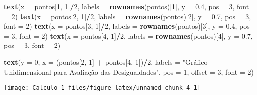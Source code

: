 \documentclass[]{book}
\newenvironment{Shaded}{\begin{snugshade}}{\end{snugshade}}
\newcommand{\KeywordTok}[1]{\textcolor[rgb]{0.13,0.29,0.53}{\textbf{#1}}}
\newcommand{\DataTypeTok}[1]{\textcolor[rgb]{0.13,0.29,0.53}{#1}}
\newcommand{\DecValTok}[1]{\textcolor[rgb]{0.00,0.00,0.81}{#1}}
\newcommand{\FloatTok}[1]{\textcolor[rgb]{0.00,0.00,0.81}{#1}}
\newcommand{\StringTok}[1]{\textcolor[rgb]{0.31,0.60,0.02}{#1}}
\newcommand{\OperatorTok}[1]{\textcolor[rgb]{0.81,0.36,0.00}{\textbf{#1}}}
\newcommand{\NormalTok}[1]{#1}
\begin{document}
\begin{Shaded}
\begin{Highlighting}[]
\KeywordTok{text}\NormalTok{(}\DataTypeTok{x =}\NormalTok{ pontos[}\DecValTok{1}\NormalTok{, }\DecValTok{1}\NormalTok{]}\OperatorTok{/}\DecValTok{2}\NormalTok{, }\DataTypeTok{labels =} \KeywordTok{rownames}\NormalTok{(pontos)[}\DecValTok{1}\NormalTok{], }\DataTypeTok{y =} \FloatTok{0.4}\NormalTok{,}
     \DataTypeTok{pos =} \DecValTok{3}\NormalTok{, }\DataTypeTok{font =} \DecValTok{2}\NormalTok{)}
\KeywordTok{text}\NormalTok{(}\DataTypeTok{x =}\NormalTok{ pontos[}\DecValTok{2}\NormalTok{, }\DecValTok{1}\NormalTok{]}\OperatorTok{/}\DecValTok{2}\NormalTok{, }\DataTypeTok{labels =} \KeywordTok{rownames}\NormalTok{(pontos)[}\DecValTok{2}\NormalTok{], }\DataTypeTok{y =} \FloatTok{0.7}\NormalTok{,}
     \DataTypeTok{pos =} \DecValTok{3}\NormalTok{, }\DataTypeTok{font =} \DecValTok{2}\NormalTok{)}
\KeywordTok{text}\NormalTok{(}\DataTypeTok{x =}\NormalTok{ pontos[}\DecValTok{3}\NormalTok{, }\DecValTok{1}\NormalTok{]}\OperatorTok{/}\DecValTok{2}\NormalTok{, }\DataTypeTok{labels =} \KeywordTok{rownames}\NormalTok{(pontos)[}\DecValTok{3}\NormalTok{], }\DataTypeTok{y =} \FloatTok{0.4}\NormalTok{,}
     \DataTypeTok{pos =} \DecValTok{3}\NormalTok{, }\DataTypeTok{font =} \DecValTok{2}\NormalTok{)}
\KeywordTok{text}\NormalTok{(}\DataTypeTok{x =}\NormalTok{ pontos[}\DecValTok{4}\NormalTok{, }\DecValTok{1}\NormalTok{]}\OperatorTok{/}\DecValTok{2}\NormalTok{, }\DataTypeTok{labels =} \KeywordTok{rownames}\NormalTok{(pontos)[}\DecValTok{4}\NormalTok{], }\DataTypeTok{y =} \FloatTok{0.7}\NormalTok{,}
     \DataTypeTok{pos =} \DecValTok{3}\NormalTok{, }\DataTypeTok{font =} \DecValTok{2}\NormalTok{)}

\KeywordTok{text}\NormalTok{(}\DataTypeTok{y =} \DecValTok{0}\NormalTok{, }\DataTypeTok{x =}\NormalTok{ (pontos[}\DecValTok{2}\NormalTok{, }\DecValTok{1}\NormalTok{] }\OperatorTok{+}\StringTok{ }\NormalTok{pontos[}\DecValTok{4}\NormalTok{, }\DecValTok{1}\NormalTok{])}\OperatorTok{/}\DecValTok{2}\NormalTok{,}
     \DataTypeTok{labels =} \StringTok{"Gráfico Unidimensional para Avaliação das Desigualdades"}\NormalTok{,}
     \DataTypeTok{pos =} \DecValTok{1}\NormalTok{, }\DataTypeTok{offset =} \DecValTok{3}\NormalTok{, }\DataTypeTok{font =} \DecValTok{2}\NormalTok{)}
\end{Highlighting}
\end{Shaded}

\begin{center}\texttt{[image: Calculo-1\_files/figure-latex/unnamed-chunk-4-1]} \end{center}

~
\end{document}
